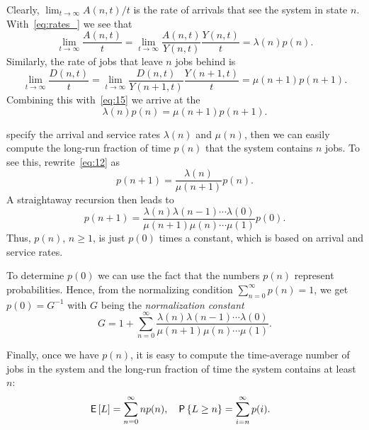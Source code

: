 Clearly, $\lim_{t\to\infty} A(n,t)/ t$ is the rate of arrivals that see the system in state $n$. With~\cref{eq:rates_} we see that
\begin{equation*}
\lim_{t\to\infty} \frac{A(n,t)}t = \lim_{t\to\infty} \frac{A(n,t)}{Y(n,t)}\frac{Y(n,t)}t = \lambda(n) p(n).
\end{equation*}
Similarly, the rate of jobs that leave $n$ jobs behind is
\begin{equation*}
\lim_{t\to\infty} \frac{D(n,t)}t = \lim_{t\to\infty} \frac{D(n,t)}{Y(n+1,t)}\frac{Y(n+1,t)}t = \mu(n+1) p(n+1).
\end{equation*}
Combining this with~\cref{eq:15} we arrive at the 
\begin{equation}\label{eq:12}
 \lambda(n) p(n) = \mu(n+1)p(n+1).
\end{equation}


 specify
 the arrival and service rates $\lambda(n)$ and $\mu(n)$,
then we can easily compute the long-run fraction of time $p(n)$ that the system contains $n$ jobs.
To see this, rewrite~\cref{eq:12} as
\begin{equation}\label{eq:25}
 p(n+1) = \frac{\lambda(n)}{\mu(n+1)}p(n).
\end{equation}
A straightaway recursion then leads to
\begin{equation*}
 p(n+1) = \frac{\lambda(n)\lambda(n-1)\cdots \lambda(0)}{\mu(n+1)\mu(n)\cdots \mu(1)}p(0).
\end{equation*}
Thus, $p(n)$, $n\geq 1$, is just $p(0)$ times a constant, which is based on  arrival and service rates.

To determine $p(0)$ we can use the fact that the numbers $p(n)$ represent probabilities.
Hence, from the normalizing condition $\sum_{n=0}^\infty p(n)=1$, we get $p(0) = G^{-1}$ with
$G$ being the \emph{normalization constant}
\begin{equation} \label{eq:20}
G = 1+\sum_{n=0}^\infty \frac{\lambda(n)\lambda(n-1)\cdots\lambda(0)}{\mu(n+1)\mu(n)\cdots \mu(1)}.
\end{equation}

Finally, once we have $p(n)$, it is easy to compute  the time-average number of jobs in the system and the long-run fraction of time the system contains at least $n$:
\begin{align*}
\,\mathsf{E}\left[L\right] &= \sum_{n=0}^\infty n p(n), & \,\mathsf{P}\left\{L \geq n\right\} &= \sum_{i=n}^\infty p(i).
\end{align*}


